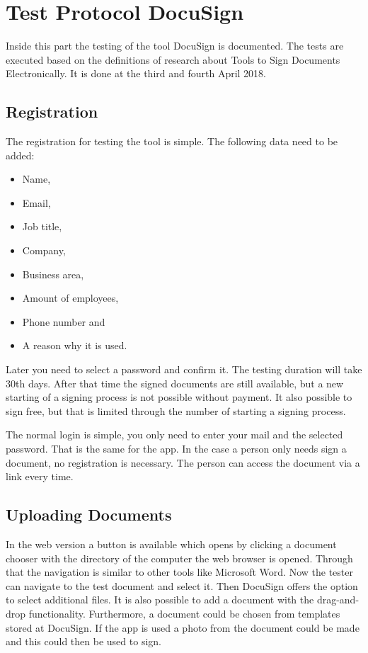 \section{Test Protocol DocuSign}
Inside this part the testing of the tool DocuSign is documented. The tests are executed based on the definitions of research about Tools to Sign Documents Electronically. It is done at the third and fourth April 2018. 

\subsection{Registration}
The registration for testing the tool is simple. The following data need to be added:
\begin{itemize}
	\item Name,
	\item Email,
	\item Job title,
	\item Company,
	\item Business area,
	\item Amount of employees,
	\item Phone number and
	\item A reason why it is used.
\end{itemize}
Later you need to select a password and confirm it. The testing duration will take 30th days. After that time the signed documents are still available, but a new starting of a signing process is not possible without payment. It also possible to sign free, but that is limited through the number of starting a signing process. 

The normal login is simple, you only need to enter your mail and the selected password. That is the same for the \gls{app}. In the case a person only needs sign a document, no registration is necessary. The person can access the document via a link every time.

\subsection{Uploading Documents}
In the web version a button is available which opens by clicking a document chooser with the directory of the computer the web browser is opened. Through that the navigation is similar to other tools like Microsoft Word. Now the tester can navigate to the test document and select it. Then DocuSign offers the option to select additional files. It is also possible to add a document with the drag-and-drop functionality. Furthermore, a document could be chosen from templates stored at DocuSign. If the \gls{app} is used a photo from the document could be made and this could then be used to sign.

